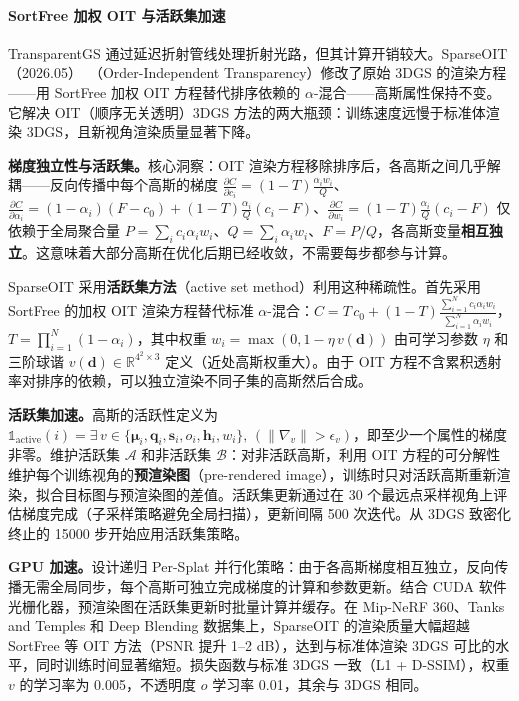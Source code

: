 \paragraph{SortFree 加权 OIT 与活跃集加速}

TransparentGS 通过延迟折射管线处理折射光路，但其计算开销较大。SparseOIT（2026.05）~\cite{2605_13855}（Order-Independent Transparency）修改了原始 3DGS 的渲染方程——用 SortFree 加权 OIT 方程替代排序依赖的 $\alpha$-混合——高斯属性保持不变。它解决 OIT（顺序无关透明）3DGS 方法的两大瓶颈：训练速度远慢于标准体渲染 3DGS，且新视角渲染质量显著下降。

\textbf{梯度独立性与活跃集。}核心洞察：OIT 渲染方程移除排序后，各高斯之间几乎解耦——反向传播中每个高斯的梯度 $\frac{\partial C}{\partial c_i} = (1-T)\frac{\alpha_i w_i}{Q}$、$\frac{\partial C}{\partial \alpha_i} = (1-\alpha_i)(F-c_0) + (1-T)\frac{\alpha_i}{Q}(c_i-F)$、$\frac{\partial C}{\partial w_i} = (1-T)\frac{\alpha_i}{Q}(c_i-F)$ 仅依赖于全局聚合量 $P = \sum_i c_i\alpha_i w_i$、$Q = \sum_i \alpha_i w_i$、$F = P/Q$，各高斯变量\textbf{相互独立}。这意味着大部分高斯在优化后期已经收敛，不需要每步都参与计算。

SparseOIT 采用\textbf{活跃集方法}（active set method）利用这种稀疏性。首先采用 SortFree 的加权 OIT 渲染方程替代标准 $\alpha$-混合：$C = T\,c_0 + (1-T)\frac{\sum_{i=1}^N c_i\alpha_i w_i}{\sum_{i=1}^N \alpha_i w_i}$，$T = \prod_{i=1}^N(1-\alpha_i)$，其中权重 $w_i = \max(0, 1-\eta\,v(\mathbf{d}))$ 由可学习参数 $\eta$ 和三阶球谐 $v(\mathbf{d}) \in \mathbb{R}^{4^2 \times 3}$ 定义（近处高斯权重大）。由于 OIT 方程不含累积透射率对排序的依赖，可以独立渲染不同子集的高斯然后合成。

\textbf{活跃集加速。}高斯的活跃性定义为 $\mathbb{1}_{\text{active}}(i) = \exists\,v \in \{\boldsymbol{\mu}_i, \mathbf{q}_i, \mathbf{s}_i, o_i, \mathbf{h}_i, w_i\},\,(\|\nabla_v\| > \epsilon_v)$，即至少一个属性的梯度非零。维护活跃集 $\mathcal{A}$ 和非活跃集 $\mathcal{B}$：对非活跃高斯，利用 OIT 方程的可分解性维护每个训练视角的\textbf{预渲染图}（pre-rendered image），训练时只对活跃高斯重新渲染，拟合目标图与预渲染图的差值。活跃集更新通过在 30 个最远点采样视角上评估梯度完成（子采样策略避免全局扫描），更新间隔 500 次迭代。从 3DGS 致密化终止的 15000 步开始应用活跃集策略。

\textbf{GPU 加速。}设计递归 Per-Splat 并行化策略：由于各高斯梯度相互独立，反向传播无需全局同步，每个高斯可独立完成梯度的计算和参数更新。结合 CUDA 软件光栅化器，预渲染图在活跃集更新时批量计算并缓存。在 Mip-NeRF 360、Tanks and Temples 和 Deep Blending 数据集上，SparseOIT 的渲染质量大幅超越 SortFree 等 OIT 方法（PSNR 提升 1--2 dB），达到与标准体渲染 3DGS 可比的水平，同时训练时间显著缩短。损失函数与标准 3DGS 一致（L1 + D-SSIM），权重 $v$ 的学习率为 0.005，不透明度 $o$ 学习率 0.01，其余与 3DGS 相同。

